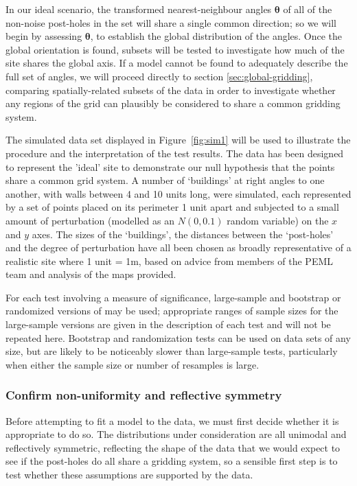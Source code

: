 \documentclass[../../ArchStats.tex]{subfiles}
\begin{document}
In our ideal scenario, the transformed nearest-neighbour angles $\boldsymbol{\theta}$ of all of the non-noise post-holes  in the set will share a single common direction; so we will begin by assessing $\boldsymbol{\theta}$, to establish the global distribution of the angles. Once the global orientation is found, subsets will be tested to investigate how much of the site shares the global axis. If a model cannot be found to adequately describe the full set of angles, we will proceed directly to section \ref{sec:global-gridding}, comparing spatially-related subsets of the data in order to investigate whether any regions of the grid can plausibly be considered to share a common gridding system.

The simulated data set displayed in Figure~\ref{fig:sim1} will be used to illustrate the procedure and the interpretation of the test results. The data has been designed to represent the 'ideal' site to demonstrate our null hypothesis that the points share a common grid system. A number of `buildings' at right angles to one another, with walls between 4 and 10 units long, were simulated, each represented by a set of points placed on its perimeter 1 unit apart and subjected to a small amount of perturbation (modelled as an $N(0,0.1)$ random variable) on the $x$ and $y$ axes. The sizes of the `buildings', the distances between the `post-holes' and the degree of perturbation have all been chosen as broadly representative of a realistic site where 1 unit = 1m, based on advice from members of the PEML team and analysis of the maps provided. 

For each test involving a measure of significance, large-sample and bootstrap or randomized versions of may be used; appropriate ranges of sample sizes for the large-sample versions are given in the description of each test and will not be repeated here. Bootstrap and randomization tests can be used on data sets of any size, but are likely to be noticeably slower than large-sample tests, particularly when either the sample size or number of resamples is large. 


\subsubsection{Confirm non-uniformity and reflective symmetry}
\label{sssec:unif-test}
Before attempting to fit a model to the data, we must first decide whether it is appropriate to do so. The distributions under consideration are all unimodal and reflectively symmetric, reflecting the shape of the data that we would expect to see if the post-holes do all share a gridding system, so a sensible first step is to test whether these assumptions are supported by the data. 
\end{document}
